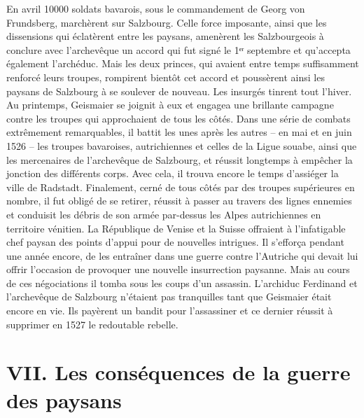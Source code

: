 \documentclass[french,twoside]{book} %
\newcommand\chapteropen{} %
\newcommand\chapterclose{} %
\begin{document}
En avril 10000 soldats bavarois, sous le commandement de Georg von Frundsberg, marchèrent sur Salzbourg. Celle force imposante, ainsi que les dissensions qui éclatèrent entre les paysans, amenèrent les Salzbourgeois à conclure avec l’archevêque un accord qui fut signé le 1ᵉʳ septembre et qu’accepta également l’archéduc. Mais les deux princes, qui avaient entre temps suffisamment renforcé leurs troupes, rompirent bientôt cet accord et poussèrent ainsi les paysans de Salzbourg à se soulever de nouveau. Les insurgés tinrent tout l’hiver. Au printemps, Geismaier se joignit à eux et engagea une brillante campagne contre les troupes qui approchaient de tous les côtés. Dans une série de combats extrêmement remarquables, il battit les unes après les autres – en mai et en juin 1526 – les troupes bavaroises, autrichiennes et celles de la Ligue souabe, ainsi que les mercenaires de l’archevêque de Salzbourg, et réussit longtemps à empêcher la jonction des différents corps. Avec cela, il trouva encore le temps d’assiéger la ville de Radstadt. Finalement, cerné de tous côtés par des troupes supérieures en nombre, il fut obligé de se retirer, réussit à passer au travers des lignes ennemies et conduisit les débris de son armée par-dessus les Alpes autrichiennes en territoire vénitien. La République de Venise et la Suisse offraient à l’infatigable chef paysan des points d’appui pour de nouvelles intrigues. Il s’efforça pendant une année encore, de les entraîner dans une guerre contre l’Autriche qui devait lui offrir l’occasion de provoquer une nouvelle insurrection paysanne. Mais au cours de ces négociations il tomba sous les coups d’un assassin. L’archiduc Ferdinand et l’archevêque de Salzbourg n’étaient pas tranquilles tant que Geismaier était encore en vie. Ils payèrent un bandit pour l’assassiner et ce dernier réussit à supprimer en 1527 le redoutable rebelle.
\chapterclose


\chapteropen
\chapter[{VII. Les conséquences de la guerre des paysans}]{VII. Les conséquences de la guerre des paysans}\renewcommand{\leftmark}{VII. Les conséquences de la guerre des paysans}
\end{document}
